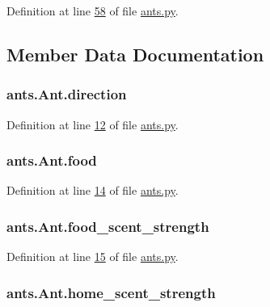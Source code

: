 Definition at line \hyperlink{ants_8py_source_l00058}{58} of file \hyperlink{ants_8py_source}{ants.\+py}.



\subsection{Member Data Documentation}
\hypertarget{classants_1_1Ant_ae26b7ffd236a83d8d5c96ec6ec07b4bb}{
\subsubsection[{direction}]{\setlength{\rightskip}{0pt plus 5cm}ants.\+Ant.\+direction}}\label{classants_1_1Ant_ae26b7ffd236a83d8d5c96ec6ec07b4bb}


Definition at line \hyperlink{ants_8py_source_l00012}{12} of file \hyperlink{ants_8py_source}{ants.\+py}.

\hypertarget{classants_1_1Ant_afcfbbf8bd338401378d25c512204eb91}{
\subsubsection[{food}]{\setlength{\rightskip}{0pt plus 5cm}ants.\+Ant.\+food}}\label{classants_1_1Ant_afcfbbf8bd338401378d25c512204eb91}


Definition at line \hyperlink{ants_8py_source_l00014}{14} of file \hyperlink{ants_8py_source}{ants.\+py}.

\hypertarget{classants_1_1Ant_ad7fb2ac4566880fdacfd7bf7f4ec1109}{
\subsubsection[{food\+\_\+scent\+\_\+strength}]{\setlength{\rightskip}{0pt plus 5cm}ants.\+Ant.\+food\+\_\+scent\+\_\+strength}}\label{classants_1_1Ant_ad7fb2ac4566880fdacfd7bf7f4ec1109}


Definition at line \hyperlink{ants_8py_source_l00015}{15} of file \hyperlink{ants_8py_source}{ants.\+py}.

\hypertarget{classants_1_1Ant_a7885f0124adf5b10fd6fa5e8ac47edb9}{
\subsubsection[{home\+\_\+scent\+\_\+strength}]{\setlength{\rightskip}{0pt plus 5cm}ants.\+Ant.\+home\+\_\+scent\+\_\+strength}}\label{classants_1_1Ant_a7885f0124adf5b10fd6fa5e8ac47edb9}


